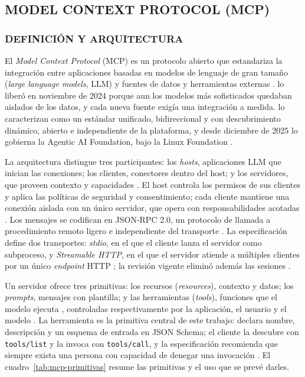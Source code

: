 \subsection{MODEL CONTEXT PROTOCOL (MCP)}
\subsubsection{DEFINICIÓN Y ARQUITECTURA}

El \textit{Model Context Protocol} (MCP) es un protocolo abierto que estandariza la integración entre aplicaciones basadas en modelos de lenguaje de gran tamaño (\textit{large language models}, LLM) y fuentes de datos y herramientas externas \parencite{MCPSpec2026}. \textcite{Anthropic2024MCP} lo liberó en noviembre de 2024 porque aun los modelos más sofisticados quedaban aislados de los datos, y cada nueva fuente exigía una integración a medida. \textcite{Hou2025} lo caracterizan como un estándar unificado, bidireccional y con descubrimiento dinámico, abierto e independiente de la plataforma, y desde diciembre de 2025 lo gobierna la Agentic AI Foundation, bajo la Linux Foundation \parencite{MCPBlog2025AAIF}.

La arquitectura distingue tres participantes: los \textit{hosts}, aplicaciones LLM que inician las conexiones; los clientes, conectores dentro del host; y los servidores, que proveen contexto y capacidades \parencite{MCPSpec2026}. El host controla los permisos de sus clientes y aplica las políticas de seguridad y consentimiento; cada cliente mantiene una conexión aislada con un único servidor, que opera con responsabilidades acotadas \parencite{MCPSpec2025}. Los mensajes se codifican en JSON-RPC 2.0, un protocolo de llamada a procedimiento remoto ligero e independiente del transporte \parencite{JSONRPC2013}. La especificación define dos transportes: \textit{stdio}, en el que el cliente lanza el servidor como subproceso, y \textit{Streamable HTTP}, en el que el servidor atiende a múltiples clientes por un único \textit{endpoint} HTTP \parencite{MCPSpec2025}; la revisión vigente eliminó además las sesiones \parencite{MCPSpec2026}.

Un servidor ofrece tres primitivas: los recursos (\textit{resources}), contexto y datos; los \textit{prompts}, mensajes con plantilla; y las herramientas (\textit{tools}), funciones que el modelo ejecuta \parencite{MCPSpec2026}, controladas respectivamente por la aplicación, el usuario y el modelo \parencite{Ehtesham2025}. La herramienta es la primitiva central de este trabajo: declara nombre, descripción y un esquema de entrada en JSON Schema; el cliente la descubre con \texttt{tools/list} y la invoca con \texttt{tools/call}, y la especificación recomienda que siempre exista una persona con capacidad de denegar una invocación \parencite{MCPSpec2025}. El cuadro~\ref{tab:mcp-primitivas} resume las primitivas y el uso que se prevé darles.


